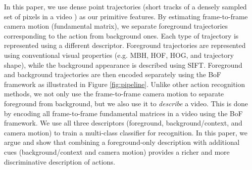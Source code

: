 In this paper, we use dense point trajectories (short tracks of a densely sampled set of pixels in a video \cite{wang2013}) as our primitive features. By estimating frame-to-frame camera motion (fundamental matrix), we separate foreground trajectories corresponding to the action from background ones. Each type of trajectory is represented using a different descriptor. Foreground trajectories are represented using conventional visual properties (e.g. MBH, HOF, HOG, and trajectory shape), while the background appearance is described using SIFT. Foreground and background trajectories are then encoded separately using the BoF framework as illustrated in Figure \ref{fig:pipeline}. Unlike other action recognition methods, we not only use the frame-to-frame camera motion to separate foreground from background, but we also use it to \emph{describe} a video. This is done by encoding all frame-to-frame fundamental matrices in a video using the BoF framework. We use all three descriptors (foreground, background/context, and camera motion) to train a multi-class classifier for recognition. In this paper, we argue and show that combining a foreground-only description \cite{wang2013} with additional cues (background/context and camera motion) provides a richer and more discriminative description of actions.




